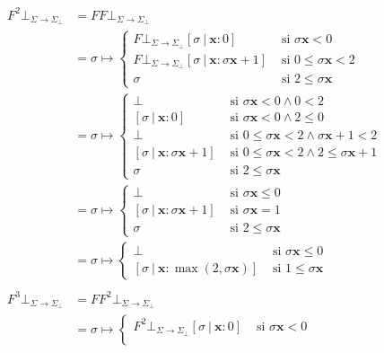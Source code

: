 \documentclass{article}
\newcommand{\x}{\textbf{x}}
\newcommand{\cdom}{\Sigma \to \Sigma_\bot}
\newcommand{\cfbot}{\bot_{\cdom}}
\begin{document}
\begin{equation*}
  \begin{aligned}
      F^2 \cfbot &= F F \cfbot \\ 
                 &= \sigma \mapsto \begin{cases}
                   F \cfbot [\sigma\ |\ \x : 0] &\text{ si }\sigma \x < 0 \\ 
                   F \cfbot [\sigma\ |\ \x : \sigma \x + 1] &\text{ si }0 \leq \sigma \x < 2 \\ 
                   \sigma &\text{ si }2 \leq \sigma \x
                 \end{cases} \\ 
                 &= \sigma \mapsto \begin{cases}
                   \bot &\text{ si }\sigma \x < 0 \land 0 < 2 \\ 
                   [\sigma\ |\ \x : 0] &\text{ si }\sigma \x < 0 \land 2 \leq 0 \\ 
                   \bot &\text{ si }0 \leq \sigma \x < 2 \land \sigma \x + 1 < 2 \\ 
                   [\sigma\ |\ \x : \sigma \x + 1] &\text{ si } 0 \leq \sigma \x < 2 \land 2 \leq \sigma \x + 1 \\ 
                   \sigma &\text{ si }2 \leq \sigma \x
                 \end{cases} \\ 
                 &= \sigma \mapsto \begin{cases}
                   \bot &\text{ si }\sigma \x \leq 0 \\ 
                   [\sigma\ |\ \x : \sigma \x + 1] &\text{ si }\sigma \x = 1 \\ 
                   \sigma &\text{ si }2 \leq \sigma \x 
                 \end{cases} \\ 
                 &= \sigma \mapsto \begin{cases}
                   \bot &\text{ si }\sigma \x \leq 0 \\ 
                   [\sigma\ |\ \x : \max(2, \sigma \x)] &\text{ si }1 \leq \sigma \x
                 \end{cases} \\ 
                 \\ 
      F^3 \cfbot &= F F^2 \cfbot \\ 
                 &= \sigma \mapsto \begin{cases}
                   F^2 \cfbot [\sigma\ |\ \x : 0] &\text{ si }\sigma \x < 0 \\ 

\end{cases}
\end{aligned}
\end{equation*}
\end{document}
